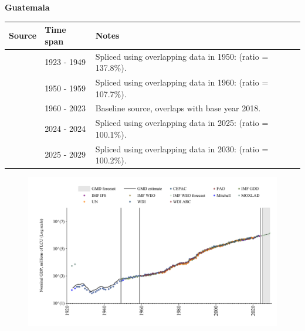 \documentclass[12pt,a4paper,landscape]{article}
\begin{document}
\begin{adjustbox}{max totalsize={\paperwidth}{\paperheight},center}
\begin{minipage}[t][\textheight][t]{\textwidth}
\vspace*{0.5cm}
{}
\begin{center}
{\Large\bfseries Guatemala}
\end{center}
\vspace{0.5cm}
\begin{table}[H]
\centering
\small
\begin{tabular}{|l|l|l|}
\hline
\textbf{Source} & \textbf{Time span} & \textbf{Notes} \\
\hline
\rowcolor{white}\cite{Mitchell}& 1923 - 1949 &Spliced using overlapping data in 1950: (ratio = 137.8\%).\\
\rowcolor{lightgray}\cite{IMF_GDD}& 1950 - 1959 &Spliced using overlapping data in 1960: (ratio = 107.7\%).\\
\rowcolor{white}\cite{WDI}& 1960 - 2023 &Baseline source, overlaps with base year 2018.\\
\rowcolor{lightgray}\cite{IMF_IFS}& 2024 - 2024 &Spliced using overlapping data in 2025: (ratio = 100.1\%).\\
\rowcolor{white}\cite{IMF_WEO_forecast}& 2025 - 2029 &Spliced using overlapping data in 2030: (ratio = 100.2\%).\\
\hline
\end{tabular}
\end{table}
\begin{figure}[H]
\centering
\includegraphics[width=\textwidth,height=0.6\textheight,keepaspectratio]{graphs/GTM_nGDP.pdf}
\end{figure}
\end{minipage}
\end{adjustbox}
\end{document}
